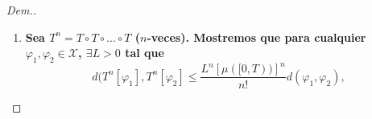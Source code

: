 \begin{proof}[Dem.]
\begin{enumerate}
Por último,  mostremos que $T[\varphi]$ es continua a izquierda. Sea $t_n \to t^-$, entonces como $[t_{n+1},t)\subset [t_n,t)$ por \cite[3.28]{Zo}

\textcolor{red}{qué es (3.28) en la referencia? Ecuación, Teorema, Lema?}\textcolor{blue}{no dice..}
\begin{equation*}
    \lim_{n\to \infty}\mu([t_n,t))=\mu\left(\bigcap_{n=1}^\infty[t_n,t)\right)=\mu(\emptyset)=0.
\end{equation*}
Luego por \eqref{afi3.1}
\begin{equation*}
\begin{split}
    \left|\int_{[0,t_n)}f(s,\varphi(s))\, d\mu - \int_{[0,t)}f(s,\varphi(s))\, d\mu   \right|&\leq \int_{[t_n,t)}|f(s,\varphi(s))|\, d\mu \\ &\leq A_\varphi\mu([t_n,t))\to 0,
\end{split}
\end{equation*}
es decir $T[\varphi](t_n)\to T[\varphi](t)$.

\item \textbf{Sea $T^n=T\circ T\circ ...\circ T$ ($n$-veces). Mostremos que  para cualquier $\varphi_1,\varphi_2\in \mathcal{X}$, $\exists L>0$ tal que }
\begin{equation}\label{eq:4.3.1}
d(T^n[\varphi_1],T^n[\varphi_2]\leq \dfrac{L^{n}\left[\mu([0,T))\right]^{n}}{n!} d(\varphi_1,\varphi_2),
\end{equation}



\end{enumerate}
\end{proof}

